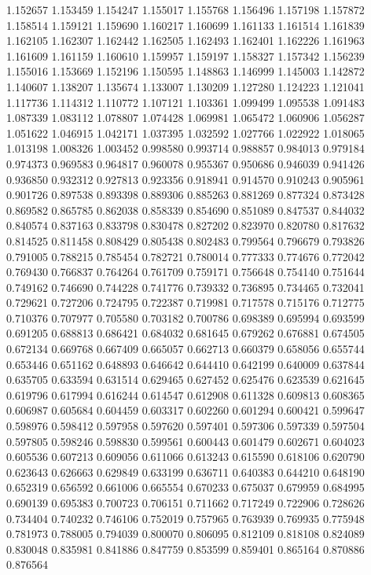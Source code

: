 1.152657
1.153459
1.154247
1.155017
1.155768
1.156496
1.157198
1.157872
1.158514
1.159121
1.159690
1.160217
1.160699
1.161133
1.161514
1.161839
1.162105
1.162307
1.162442
1.162505
1.162493
1.162401
1.162226
1.161963
1.161609
1.161159
1.160610
1.159957
1.159197
1.158327
1.157342
1.156239
1.155016
1.153669
1.152196
1.150595
1.148863
1.146999
1.145003
1.142872
1.140607
1.138207
1.135674
1.133007
1.130209
1.127280
1.124223
1.121041
1.117736
1.114312
1.110772
1.107121
1.103361
1.099499
1.095538
1.091483
1.087339
1.083112
1.078807
1.074428
1.069981
1.065472
1.060906
1.056287
1.051622
1.046915
1.042171
1.037395
1.032592
1.027766
1.022922
1.018065
1.013198
1.008326
1.003452
0.998580
0.993714
0.988857
0.984013
0.979184
0.974373
0.969583
0.964817
0.960078
0.955367
0.950686
0.946039
0.941426
0.936850
0.932312
0.927813
0.923356
0.918941
0.914570
0.910243
0.905961
0.901726
0.897538
0.893398
0.889306
0.885263
0.881269
0.877324
0.873428
0.869582
0.865785
0.862038
0.858339
0.854690
0.851089
0.847537
0.844032
0.840574
0.837163
0.833798
0.830478
0.827202
0.823970
0.820780
0.817632
0.814525
0.811458
0.808429
0.805438
0.802483
0.799564
0.796679
0.793826
0.791005
0.788215
0.785454
0.782721
0.780014
0.777333
0.774676
0.772042
0.769430
0.766837
0.764264
0.761709
0.759171
0.756648
0.754140
0.751644
0.749162
0.746690
0.744228
0.741776
0.739332
0.736895
0.734465
0.732041
0.729621
0.727206
0.724795
0.722387
0.719981
0.717578
0.715176
0.712775
0.710376
0.707977
0.705580
0.703182
0.700786
0.698389
0.695994
0.693599
0.691205
0.688813
0.686421
0.684032
0.681645
0.679262
0.676881
0.674505
0.672134
0.669768
0.667409
0.665057
0.662713
0.660379
0.658056
0.655744
0.653446
0.651162
0.648893
0.646642
0.644410
0.642199
0.640009
0.637844
0.635705
0.633594
0.631514
0.629465
0.627452
0.625476
0.623539
0.621645
0.619796
0.617994
0.616244
0.614547
0.612908
0.611328
0.609813
0.608365
0.606987
0.605684
0.604459
0.603317
0.602260
0.601294
0.600421
0.599647
0.598976
0.598412
0.597958
0.597620
0.597401
0.597306
0.597339
0.597504
0.597805
0.598246
0.598830
0.599561
0.600443
0.601479
0.602671
0.604023
0.605536
0.607213
0.609056
0.611066
0.613243
0.615590
0.618106
0.620790
0.623643
0.626663
0.629849
0.633199
0.636711
0.640383
0.644210
0.648190
0.652319
0.656592
0.661006
0.665554
0.670233
0.675037
0.679959
0.684995
0.690139
0.695383
0.700723
0.706151
0.711662
0.717249
0.722906
0.728626
0.734404
0.740232
0.746106
0.752019
0.757965
0.763939
0.769935
0.775948
0.781973
0.788005
0.794039
0.800070
0.806095
0.812109
0.818108
0.824089
0.830048
0.835981
0.841886
0.847759
0.853599
0.859401
0.865164
0.870886
0.876564
